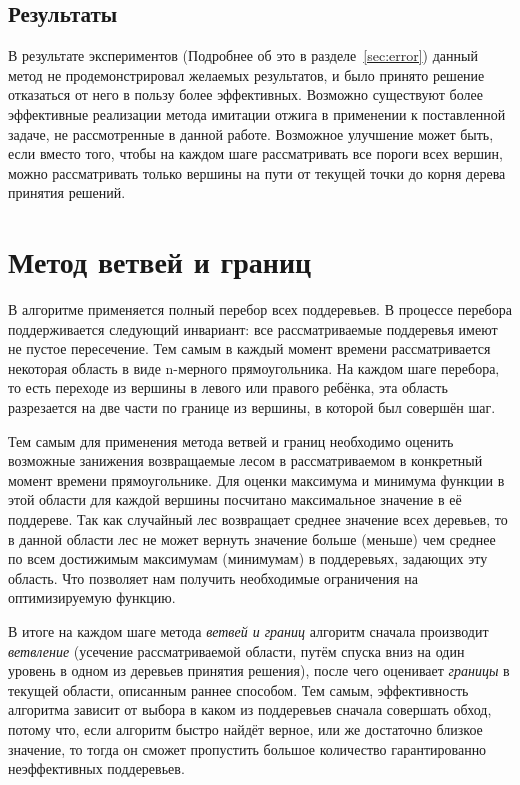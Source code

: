 \subsection{Результаты}

В результате экспериментов (Подробнее об это в разделе~\ref{sec:error}) данный
метод не продемонстрировал желаемых результатов, и было принято решение
отказаться от него в пользу более эффективных. Возможно существуют более
эффективные реализации метода имитации отжига в применении к поставленной
задаче, не рассмотренные в данной работе. Возможное улучшение может быть, если
вместо того, чтобы на каждом шаге рассматривать все пороги всех вершин, можно
рассматривать только вершины на пути от текущей точки до корня дерева принятия
решений.

\section{Метод ветвей и границ}\label{sec:heu}

В алгоритме применяется полный перебор всех поддеревьев. В процессе перебора
поддерживается следующий инвариант: все рассматриваемые поддеревья имеют не
пустое пересечение. Тем самым в каждый момент времени рассматривается некоторая
область в виде n-мерного прямоугольника. На каждом шаге перебора, то есть
переходе из вершины в левого или правого ребёнка, эта область разрезается на две
части по границе из вершины, в которой был совершён шаг.

Тем самым для применения метода ветвей и границ необходимо оценить возможные
занижения возвращаемые лесом в рассматриваемом в конкретный момент времени
прямоугольнике. Для оценки максимума и минимума функции в этой области для
каждой вершины посчитано максимальное значение в её поддереве. Так как случайный
лес возвращает среднее значение всех деревьев, то в данной области лес не может
вернуть значение больше (меньше) чем среднее по всем достижимым максимумам
(минимумам) в поддеревьях, задающих эту область. Что позволяет нам получить
необходимые ограничения на оптимизируемую функцию.

В итоге на каждом шаге метода \emph{ветвей и границ} алгоритм сначала производит
\emph{ветвление} (усечение рассматриваемой области, путём спуска вниз на один
уровень в одном из деревьев принятия решения), после чего оценивает
\emph{границы} в текущей области, описанным раннее способом. Тем самым,
эффективность алгоритма зависит от выбора в каком из поддеревьев сначала
совершать обход, потому что, если алгоритм быстро найдёт верное, или же
достаточно близкое значение, то тогда он сможет пропустить большое количество
гарантированно неэффективных поддеревьев.

